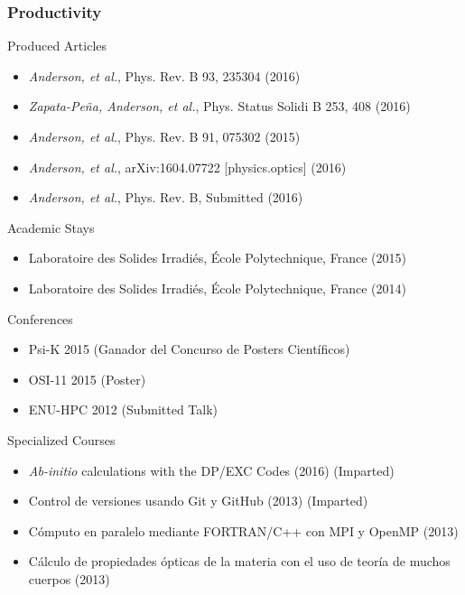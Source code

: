 \documentclass{beamer}
\begin{document}
\begin{frame}
\frametitle{Productivity}
\begin{block}{Produced Articles}
\begin{itemize}
\small
\item \emph{Anderson, et al.}, Phys. Rev. B 93, 235304 (2016)
\item \emph{Zapata-Pe\~na, Anderson, et al.}, 
            Phys. Status Solidi B 253, 408 (2016) %
\item \emph{Anderson, et al.}, Phys. Rev. B 91, 075302 (2015)
\item \emph{Anderson, et al.}, arXiv:1604.07722 [physics.optics] (2016)
\item \emph{Anderson, et al.}, Phys. Rev. B, Submitted (2016)
\end{itemize}
\end{block}
\begin{block}{Academic Stays}
\begin{itemize}
\small
\item Laboratoire des Solides Irradi\'es, \'Ecole Polytechnique, France (2015)
\item Laboratoire des Solides Irradi\'es, \'Ecole Polytechnique, France (2014)
\end{itemize}
\end{block}
\end{frame}

\begin{frame}
\begin{block}{Conferences}
\begin{itemize}
\item Psi-K 2015 (Ganador del Concurso de Posters Cient\'ificos)
\item OSI-11 2015 (Poster)
\item ENU-HPC 2012 (Submitted Talk)
\end{itemize}
\end{block}
\begin{block}{Specialized Courses}
\begin{itemize}
\item \emph{Ab-initio} calculations with the DP/EXC Codes (2016) (Imparted)
\item Control de versiones usando Git y GitHub (2013) (Imparted)
\item C\'omputo en paralelo mediante FORTRAN/C++ con MPI y OpenMP (2013)
\item C\'alculo de propiedades \'opticas de la materia con el uso de teor\'ia 
      de muchos cuerpos (2013)
\end{itemize}
\end{block}
\end{frame}
\end{document}
